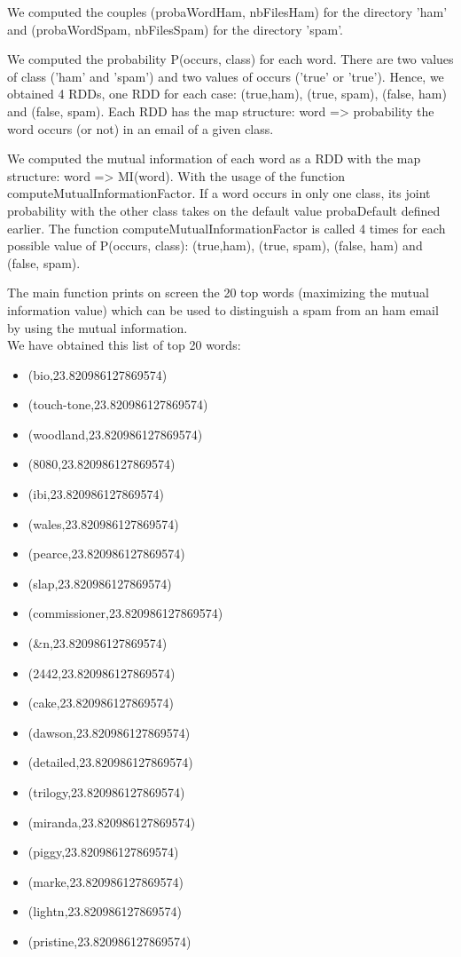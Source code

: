 \documentclass[paper=a4, fontsize=11pt]{scrartcl}
\numberwithin{equation}{section}		%
\numberwithin{figure}{section}			%
\numberwithin{table}{section}				%
\begin{document}
\begin{alphalist}
	\item We computed the couples (probaWordHam, nbFilesHam) for the directory 'ham' and (probaWordSpam, nbFilesSpam) for the directory 'spam'.
	\item We computed the probability P(occurs, class) for each word. There are two values of class ('ham' and 'spam') and two values of occurs ('true' or 'true'). Hence, we obtained 4 RDDs, one RDD for each case: (true,ham), (true, spam), (false, ham) and (false, spam). Each RDD has the map structure: word => probability the word occurs (or not) in an email of a given class.
	\item We computed the mutual information of each word as a RDD with the map structure: word => MI(word). With the usage of the function	computeMutualInformationFactor. If a word occurs in only one class, its	joint probability with the other class takes on the default value probaDefault defined earlier.	The function computeMutualInformationFactor is called 4 times for each possible value of P(occurs, class): (true,ham), (true, spam), (false, ham) and (false, spam).
	\item The main function  prints on screen the 20 top words (maximizing the mutual information value) which can be used to distinguish a spam from an ham email by using the mutual information. \\

We have obtained this list of top 20 words: \\
      \begin{itemize}
\item (bio,23.820986127869574)
\item (touch-tone,23.820986127869574)
\item (woodland,23.820986127869574)
\item (8080,23.820986127869574)
\item (ibi,23.820986127869574)
\item (wales,23.820986127869574)
\item (pearce,23.820986127869574)
\item (slap,23.820986127869574)
\item (commissioner,23.820986127869574)
\item (&n,23.820986127869574)
\item (2442,23.820986127869574)
\item (cake,23.820986127869574)
\item (dawson,23.820986127869574)
\item (detailed,23.820986127869574)
\item (trilogy,23.820986127869574)
\item (miranda,23.820986127869574)
\item (piggy,23.820986127869574)
\item (marke,23.820986127869574)
\item (lightn,23.820986127869574)
\item (pristine,23.820986127869574)
     

\end{itemize}
\end{alphalist}
\end{document}
